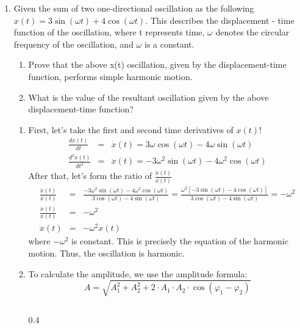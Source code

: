 \documentclass[t,aspectratio=169]{beamer}
\begin{document}
\begin{frame}
\begin{enumerate}
\pagebreak

\item  Given the sum of two one-directional oscillation as the following $x(t) = 3\sin(\omega t) + 4\cos(\omega t).$ This describes the displacement - time function of the oscillation, where t represents time, $\omega$ denotes the circular frequency of the oscillation, and $\omega$ is a constant.
\begin{enumerate}
  \item[a)] Prove that the above x(t) oscillation, given by the displacement-time function, performs simple harmonic motion.
  \item[b)] What is the value of the resultant oscillation given by the above displacement-time function?
\end{enumerate}

\begin{enumerate}
\item[a)] 
First, let’s take the first and second time derivatives of $x\left(t\right)$!
\begin{eqnarray*}
\frac{dx\left(t\right)}{dt}&=&\dot{x}(t) = 3\omega \cos(\omega t) - 4\omega \sin(\omega t)\\
  \frac{d^{2}x\left(t\right)}{dt^{2}}&=&\ddot{x}(t) = -3\omega^2 \sin(\omega t) - 4\omega^2 \cos(\omega t)
\end{eqnarray*}
After that, let’s form the ratio of $\frac{\ddot{x}\left(t\right)}{x\left(t\right)}$
\begin{eqnarray*}
  \frac{\ddot{x}(t)}{x(t)} &=& \frac{-3\omega^2 \sin(\omega t) - 4\omega^2 \cos(\omega t)}{3 \cos(\omega t) - 4 \sin(\omega t)} =  \frac{\omega^{2}\left[-3 \sin(\omega t) - 4 \cos(\omega t)\right]}{3 \cos(\omega t) - 4 \sin(\omega t)} = -\omega^2 \\
\frac{\ddot{x}(t)}{x(t)} &=& -\omega^2 \\
\ddot{x}(t) &=& -\omega^2 x(t)
\end{eqnarray*}
where $-\omega^{2}$ is constant. This is precisely the equation of the harmonic motion. Thus, the oscillation is harmonic.

\item[b)] To calculate the amplitude, we use the amplitude formula:
  $$A = \sqrt{A^{2}_{1} + A^{2}_{2} + 2 \cdot A_{1} \cdot A_{2} \cdot \cos\left(\varphi_{1} - \varphi_{2}\right)}$$

\pagebreak
\begin{columns}
  \begin{column}{0.4\linewidth}
    \begin{center}
\end{center}
\end{column}
\end{columns}
\end{enumerate}
\end{enumerate}
\end{frame}
\end{document}
